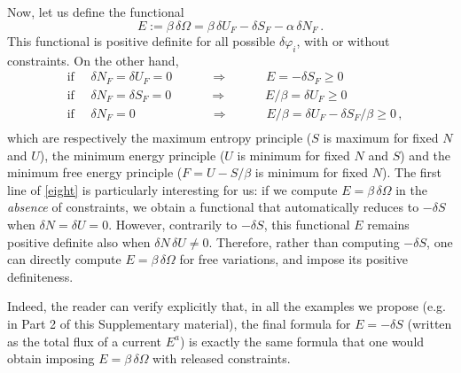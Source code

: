 \documentclass[a4paper, amsfonts, amssymb, amsmath, reprint, showkeys, nofootinbib, twoside, onecolumn,notitlepage]{revtex4-1}
\newcommand{\spc}{\quad \quad \quad}
\begin{document}
Now, let us define the functional
\begin{equation}\label{gruzzo}
E := \beta \, \delta \Omega = \beta \, \delta U_F -  \delta S_F -\alpha \, \delta N_F  \, .
\end{equation}
This functional is positive definite for all possible $\delta \varphi_i$, with or without constraints. On the other hand,
\begin{equation}\label{eight}
\begin{split}
& \text{if } \quad \delta N_F = \delta U_F =0 \spc \Rightarrow \spc E=-\delta S_F \geq 0 \\
& \text{if }\quad \delta N_F = \delta S_F =0 \spc \Rightarrow \spc E/\beta= \delta U_F \geq 0 \\
& \text{if }\quad \delta N_F  =0 \spc \spc \Rightarrow \spc E/\beta = \delta U_F - \delta S_F/\beta \geq 0 \, , \\
\end{split}
\end{equation}
which are respectively the maximum entropy principle ($S$ is maximum for fixed $N$ and $U$), the minimum energy principle ($U$ is minimum for fixed $N$ and $S$) and the minimum free energy principle ($F=U-S/\beta$ is minimum for fixed $N$). The first line of \eqref{eight} is particularly interesting for us: if we compute $E=\beta \, \delta \Omega$ in the \textit{absence} of constraints, we obtain a functional that automatically reduces to $-\delta S$ when $\delta N = \delta U=0$. However, contrarily to $-\delta S$, this functional $E$ remains positive definite also when $\delta N \, \delta U \neq 0$. Therefore, rather than computing $-\delta S$, one can directly compute $E=\beta \, \delta \Omega$ for free variations, and impose its positive definiteness. 

Indeed, the reader can verify explicitly that, in all the examples we propose (e.g. in Part 2 of this Supplementary material), the final formula for $E=-\delta S$ (written as the total flux of a current $E^a$) is exactly the same formula that one would obtain imposing $E=\beta \, \delta \Omega$ with released constraints.
\end{document}
